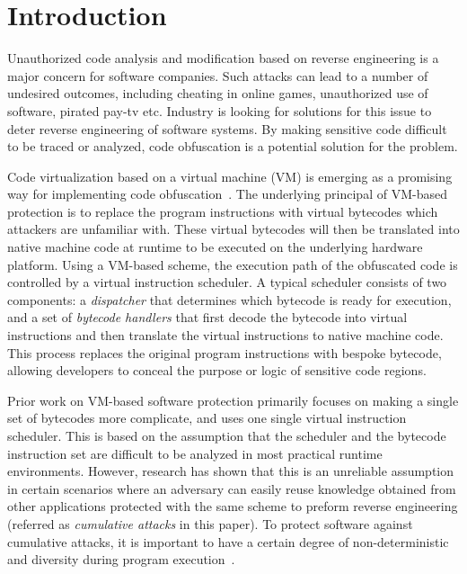 \section{Introduction}
Unauthorized code analysis and modification based on reverse engineering is a major concern for software companies.
Such attacks can lead to a number of undesired outcomes,
including cheating in online games, unauthorized use of software, pirated pay-tv etc.
Industry is looking for solutions for this issue to deter reverse engineering of software systems.
By making sensitive code difficult to be traced or analyzed, code obfuscation is a potential solution for the problem.

Code virtualization based on a virtual machine (VM) is emerging as a
promising way for implementing code
obfuscation~\cite{1Themida,2CV,3Vmprotect,5fang2011multi,6ming2011software,7wang2014tdvmp,8wang2013nislvmp}.
The underlying principal of VM-based protection is to replace the program
instructions with virtual bytecodes which attackers are unfamiliar with.
These virtual bytecodes will then be translated into native machine code at
runtime to be executed on the underlying hardware platform. Using a VM-based
scheme, the execution path of the obfuscated code is controlled by a virtual
instruction scheduler. A typical scheduler consists of two components: a
\emph{dispatcher} that determines which bytecode is ready for execution, and
a set of \emph{bytecode handlers} that first decode the bytecode into virtual 
instructions and then translate the virtual instructions to native
machine code. This process replaces the original program instructions with
bespoke bytecode, allowing developers to conceal the purpose or logic of
sensitive code regions.

Prior work on VM-based software protection primarily focuses on making a
single set of bytecodes more complicate, and uses one single virtual
instruction scheduler. This is based on the assumption that the scheduler and
the bytecode instruction set are difficult to be analyzed in most practical
runtime environments. However, research has shown that this is an unreliable
assumption~\cite{10falliere2009inside} in certain scenarios where an
adversary can easily reuse knowledge obtained from other applications
protected with the same scheme to preform reverse engineering (referred as
\emph{cumulative attacks} in this paper). To protect software against
cumulative attacks, it is important to have a certain degree of non-deterministic
and diversity during program execution~\cite{4collberg}.

